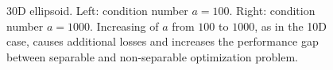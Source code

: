 \begin{figure}[h!]
\begin{minipage}[b]{0.5\linewidth}
 \centering
\end{minipage}
\begin{minipage}[b]{0.5\linewidth}
 \centering
\end{minipage}
\caption{30D ellipsoid. Left: condition number $a\!=\!100$.  Right: condition number $a\!=\!1000$. Increasing of $a$ from $100$ to $1000$, as in the 10D case, causes additional losses and increases the performance gap between separable and non-separable optimization problem.} 

\label{ellipse_t2}
\end{figure}

